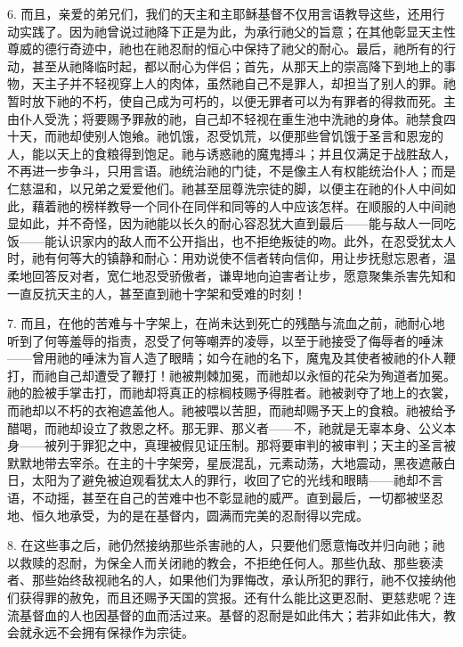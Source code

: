 6. 而且，亲爱的弟兄们，我们的天主和主耶稣基督不仅用言语教导这些，还用行动实践了。因为祂曾说过祂降下正是为此，为承行祂父的旨意；在其他彰显天主性尊威的德行奇迹中，祂也在祂忍耐的恒心中保持了祂父的耐心。最后，祂所有的行动，甚至从祂降临时起，都以耐心为伴侣；首先，从那天上的崇高降下到地上的事物，天主子并不轻视穿上人的肉体，虽然祂自己不是罪人，却担当了别人的罪。祂暂时放下祂的不朽，使自己成为可朽的，以便无罪者可以为有罪者的得救而死。主由仆人受洗；将要赐予罪赦的祂，自己却不轻视在重生池中洗祂的身体。祂禁食四十天，而祂却使别人饱飨。祂饥饿，忍受饥荒，以便那些曾饥饿于圣言和恩宠的人，能以天上的食粮得到饱足。祂与诱惑祂的魔鬼搏斗；并且仅满足于战胜敌人，不再进一步争斗，只用言语。祂统治祂的门徒，不是像主人有权能统治仆人；而是仁慈温和，以兄弟之爱爱他们。祂甚至屈尊洗宗徒的脚，以便主在祂的仆人中间如此，藉着祂的榜样教导一个同仆在同伴和同等的人中应该怎样。在顺服的人中间祂显如此，并不奇怪，因为祂能以长久的耐心容忍犹大直到最后——能与敌人一同吃饭——能认识家内的敌人而不公开指出，也不拒绝叛徒的吻。此外，在忍受犹太人时，祂有何等大的镇静和耐心：用劝说使不信者转向信仰，用让步抚慰忘恩者，温柔地回答反对者，宽仁地忍受骄傲者，谦卑地向迫害者让步，愿意聚集杀害先知和一直反抗天主的人，甚至直到祂十字架和受难的时刻！\par

7. 而且，在他的苦难与十字架上，在尚未达到死亡的残酷与流血之前，祂耐心地听到了何等羞辱的指责，忍受了何等嘲弄的凌辱，以至于祂接受了侮辱者的唾沫——曾用祂的唾沫为盲人造了眼睛；如今在祂的名下，魔鬼及其使者被祂的仆人鞭打，而祂自己却遭受了鞭打！祂被荆棘加冕，而祂却以永恒的花朵为殉道者加冕。祂的脸被手掌击打，而祂却将真正的棕榈枝赐予得胜者。祂被剥夺了地上的衣裳，而祂却以不朽的衣袍遮盖他人。祂被喂以苦胆，而祂却赐予天上的食粮。祂被给予醋喝，而祂却设立了救恩之杯。那无罪、那义者——不，祂就是无辜本身、公义本身——被列于罪犯之中，真理被假见证压制。那将要审判的被审判；天主的圣言被默默地带去宰杀。在主的十字架旁，星辰混乱，元素动荡，大地震动，黑夜遮蔽白日，太阳为了避免被迫观看犹太人的罪行，收回了它的光线和眼睛——祂却不言语，不动摇，甚至在自己的苦难中也不彰显祂的威严。直到最后，一切都被坚忍地、恒久地承受，为的是在基督内，圆满而完美的忍耐得以完成。\par

8. 在这些事之后，祂仍然接纳那些杀害祂的人，只要他们愿意悔改并归向祂；祂以救赎的忍耐，为保全人而关闭祂的教会，不拒绝任何人。那些仇敌、那些亵渎者、那些始终敌视祂名的人，如果他们为罪悔改，承认所犯的罪行，祂不仅接纳他们获得罪的赦免，而且还赐予天国的赏报。还有什么能比这更忍耐、更慈悲呢？连流基督血的人也因基督的血而活过来。基督的忍耐是如此伟大；若非如此伟大，教会就永远不会拥有保禄作为宗徒。\par

